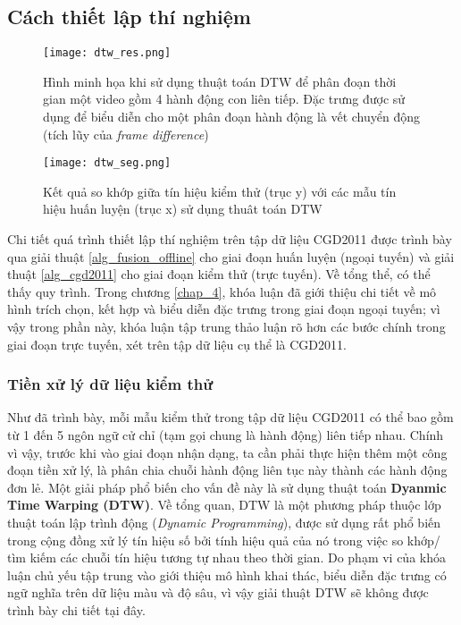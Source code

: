 \subsection{Cách thiết lập thí nghiệm}
\begin{figure}
\centering
\texttt{[image: dtw\_res.png]}
\caption{Hình minh họa khi sử dụng thuật toán DTW để phân đoạn thời gian một video gồm 4 hành động con liên tiếp. Đặc trưng được sử dụng để biểu diễn cho một phân đoạn hành động là vết chuyển động (tích lũy của \textit{frame difference})}
\label{fig_dtw_res}
\end{figure}
\begin{figure}
\centering
\texttt{[image: dtw\_seg.png]}
\caption{Kết quả so khớp giữa tín hiệu kiểm thử (trục y) với các mẫu tín hiệu huấn luyện (trục x) sử dụng thuât toán DTW}
\label{fig_dtw_seg}
\end{figure}
Chi tiết quá trình thiết lập thí nghiệm trên tập dữ liệu CGD2011 được trình bày qua giải thuật \ref{alg_fusion_offline} cho giai đoạn huấn luyện (ngoại tuyến) và giải thuật \ref{alg_cgd2011} cho giai đoạn kiểm thử (trực tuyến). Về tổng thể, có thể thấy quy trình. Trong chương \ref{chap_4}, khóa luận đã giới thiệu chi tiết về mô hình trích chọn, kết hợp và biểu diễn đặc trưng trong giai đoạn ngoại tuyến; vì vậy trong phần này, khóa luận tập trung thảo luận rõ hơn các bước chính trong giai đoạn trực tuyến, xét trên tập dữ liệu cụ thể là CGD2011.

\subsubsection{Tiền xử lý dữ liệu kiểm thử}
Như đã trình bày, mỗi mẫu kiểm thử trong tập dữ liệu CGD2011 có thể bao gồm từ 1 đến 5 ngôn ngữ cử chỉ (tạm gọi chung là hành động) liên tiếp nhau. Chính vì vậy, trước khi vào giai đoạn nhận dạng, ta cần phải thực hiện thêm một công đoạn tiền xử lý, là phân chia chuỗi hành động liên tục này thành các hành động đơn lẻ. Một giải pháp phổ biến cho vấn đề này là sử dụng thuật toán \textbf{Dyanmic Time Warping (DTW)}\cite{Isabelle_Chalearn}. Về tổng quan, DTW là một phương pháp thuộc lớp thuật toán lập trình động (\textit{Dynamic Programming}), được sử dụng rất phổ biến trong cộng đồng xử lý tín hiệu số bởi tính hiệu quả của nó trong việc so khớp/ tìm kiếm các chuỗi tín hiệu tương tự nhau theo thời gian. Do phạm vi của khóa luận chủ yếu tập trung vào giới thiệu mô hình khai thác, biểu diễn đặc trưng có ngữ nghĩa trên dữ liệu màu và độ sâu, vì vậy giải thuật DTW sẽ không được trình bày chi tiết tại đây.


